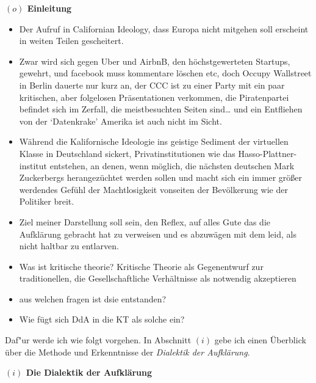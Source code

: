 \documentclass[a4paper, 12pt]{article}
\begin{document}
\begin{onehalfspace} 

\noindent\textbf{$(o)$ Einleitung}

\noindent %

\begin{itemize}
  \item Der Aufruf in Californian Ideology, dass Europa nicht mitgehen soll erscheint in weiten Teilen gescheitert. 
  \item Zwar wird sich gegen Uber und AirbnB, den höchstgewerteten Startups, gewehrt, und facebook muss kommentare löschen etc, doch Occupy Wallstreet in Berlin dauerte nur kurz an, der CCC ist zu einer Party mit ein paar kritischen, aber folgelosen Präsentationen verkommen, die Piratenpartei befindet sich im Zerfall, die meistbesuchten Seiten sind… und ein Entfliehen von der ‘Datenkrake’ Amerika ist auch nicht im Sicht. 
\item Während die Kalifornische Ideologie ins geistige Sediment der virtuellen Klasse in Deutschland sickert, Privatinstitutionen wie das Hasso-Plattner-institut entstehen, an denen, wenn möglich, die nächsten deutschen Mark Zuckerbergs herangezüchtet werden sollen und macht sich ein immer größer werdendes Gefühl der Machtlosigkeit vonseiten der Bevölkerung wie der Politiker breit.
\item Ziel meiner Darstellung soll sein, den Reflex, auf alles Gute das die Aufklärung gebracht hat zu verweisen und es abzuwägen mit dem leid, als nicht haltbar zu entlarven.
   \item Was ist kritische theorie? Kritische Theorie als Gegenentwurf zur traditionellen, die Gesellschaftliche Verhältnisse als notwendig akzeptieren
  \item aus welchen fragen ist dsie entstanden?
  \item Wie fügt sich DdA in die KT als solche ein?
\end{itemize}


Daf"ur werde ich wie folgt vorgehen. In Abschnitt $(i)$ gebe ich einen Überblick über die Methode und Erkenntnisse der \emph{Dialektik der Aufklärung}. 

\vspace{5mm}

\noindent\textbf{$(i)$ Die Dialektik der Aufklärung}


\end{onehalfspace}
\end{document}
